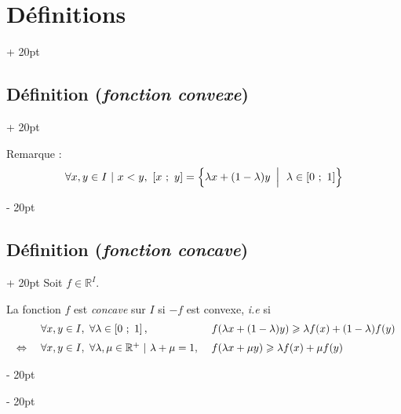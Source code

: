 \documentclass[a4paper, 12pt, twoside]{article}
\newcommand{\R}{\mathbb{R}} %
\newcommand{\seg}[2]{\left[ #1\ ;\ #2 \right]}
\newcommand{\lr}[1]{\left( #1 \right)}
\newcommand{\set}[1]{\left\{ #1 \right\}}
\newcommand{\ssi}{\ \Leftrightarrow \ }
\renewcommand{\ge}{\geqslant}
\newcommand{\ind}[1][20pt]{\advance\leftskip + #1}
\newcommand{\deind}[1][20pt]{\advance\leftskip - #1}
\newenvironment{indt}[2][20pt]{#2 \par \ind[#1]}{\par \deind} %
\begin{document}
\begin{indt}{\section{Définitions}}
\begin{indt}{\subsection{Définition (\textit{fonction convexe})}}
\begin{center}
            \end{center}

            \vspace{6pt}
            
            Remarque :
            \[
                \forall x, y \in I\ |\ x < y,\
                \seg x y = \set{\lambda x + (1 - \lambda)y\ \left| \vphantom{\dfrac a a} \right.\ \lambda \in \seg 0 1}
            \]
        \end{indt}

        \vspace{12pt}
        
        \begin{indt}{\subsection{Définition (\textit{fonction concave})}}
            Soit $f \in \R^I$.

            La fonction $f$ est \textit{concave} sur $I$ si $-f$ est convexe, \textit{i.e} si
            \[
                \begin{array}{cll}
                    & \forall x, y \in I,\
                    \forall \lambda \in \seg 0 1,
                    & f\!\lr{\lambda x + (1 - \lambda)y} \ge \lambda f(x) + (1 - \lambda) f(y)
                    \vspace{6pt}
                    \\
                    \ssi& \forall x, y \in I,\
                    \forall \lambda, \mu \in \R^+\ |\ \lambda + \mu = 1,\
                    & f\!\lr{\lambda x + \mu y} \ge \lambda f(x) + \mu f(y)
                \end{array}
            \]
        \end{indt}
        
    \end{indt}

    \vspace{12pt}
    
\end{document}
